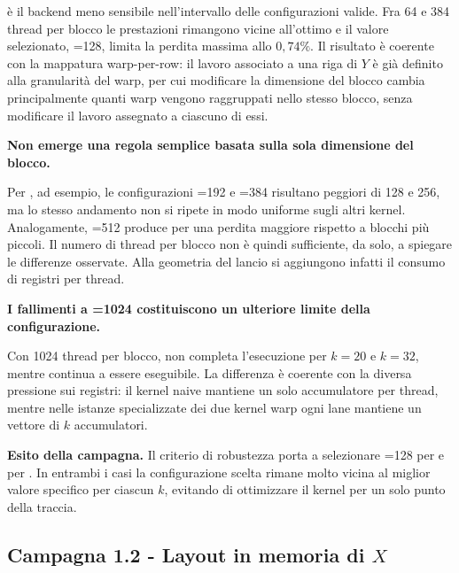  è il backend meno sensibile nell'intervallo delle
configurazioni valide. Fra 64 e 384 thread per blocco le prestazioni rimangono
vicine all'ottimo e il valore selezionato, =128, limita la perdita
massima allo $0{,}74\%$. Il risultato è coerente con la mappatura
warp-per-row: il lavoro associato a una riga di $Y$ è già definito alla
granularità del warp, per cui modificare la dimensione del blocco cambia
principalmente quanti warp vengono raggruppati nello stesso blocco, senza
modificare il lavoro assegnato a ciascuno di essi.

\textbf{Non emerge una regola semplice basata sulla sola dimensione del
blocco.}

Per , ad esempio, le configurazioni
=192 e =384 risultano peggiori di 128 e 256, ma lo
stesso andamento non si ripete in modo uniforme sugli altri kernel.
Analogamente, =512 produce per  una perdita
maggiore rispetto a blocchi più piccoli. Il numero di thread per blocco non è
quindi sufficiente, da solo, a spiegare le differenze osservate. Alla
geometria del lancio si aggiungono infatti il consumo di registri per thread.

\textbf{I fallimenti a =1024 costituiscono un ulteriore limite
della configurazione.}

Con 1024 thread per blocco,
  non completa
l'esecuzione per $k=20$ e $k=32$, mentre  continua a
essere eseguibile. La differenza è coerente con la diversa pressione sui
registri: il kernel naive mantiene un solo accumulatore per thread, mentre
nelle istanze specializzate dei due kernel warp ogni lane mantiene un vettore
di $k$ accumulatori.

\textbf{Esito della campagna.}
Il criterio di robustezza porta a selezionare =128 per
 e per . In entrambi i casi la
configurazione scelta rimane molto vicina al miglior valore specifico per
ciascun $k$, evitando di ottimizzare il kernel per un solo punto della
traccia.

\subsection{Campagna 1.2 - Layout in memoria di $X$}
\label{sec:ris-layout}

